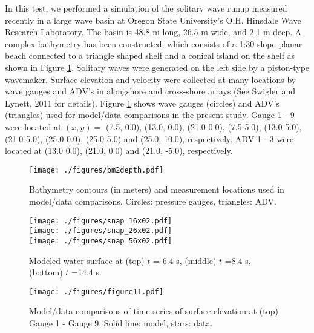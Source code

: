 \documentclass[11pt]{article}
\begin{document}
In this test, we performed a simulation of the solitary wave runup measured  recently in a large wave basin at Oregon State University's O.H. Hinsdale Wave Research Laboratory.  The basin is 48.8 m long, 26.5 m wide, and 2.1 m deep.  A complex bathymetry has been constructed, which  consists of  a 1:30 slope planar beach connected to a triangle shaped  shelf and a conical island on the shelf as shown  in Figure \ref{fig8}.    Solitary waves were generated on the left side by a piston-type wavemaker. Surface elevation and velocity were collected at many locations by wave gauges and ADV's in alongshore and cross-shore arrays (See Swigler and Lynett, 2011 for details). Figure \ref{fig8} shows  wave gauges (circles)  and  ADV's (triangles) used for model/data comparisons in the present study. Gauge 1 - 9 were located at $(x,y) = $ (7.5, 0.0), (13.0, 0.0), (21.0 0.0), (7.5 5.0), (13.0 5.0), (21.0 5.0), (25.0 0.0), (25.0 5.0) and (25.0, 10.0), respectively. ADV 1 -  3 were located at (13.0 0.0), (21.0, 0.0) and (21.0, -5.0), respectively.   



\begin{figure}[htbp]
\centering
\texttt{[image: ./figures/bm2depth.pdf]}
\caption{Bathymetry contours (in meters) and measurement locations used in model/data comparisons. Circles: pressure gauges, triangles: ADV.}
\label{fig8}
\end{figure}


\begin{figure}[htbp]
\centering
\texttt{[image: ./figures/snap\_16x02.pdf]} \\
\texttt{[image: ./figures/snap\_26x02.pdf]} \\
\texttt{[image: ./figures/snap\_56x02.pdf]}			
\caption{Modeled water surface at (top)  $t$ = 6.4 s, (middle) $ t$ =8.4 s, (bottom) $ t$ =14.4 s.}
\label{snap1}
\end{figure}


\begin{figure}[htbp]
\centering
\texttt{[image: ./figures/figure11.pdf]}	
\caption{Model/data comparisons of time series of surface elevation at (top) Gauge 1 -  Gauge 9. Solid line: model,  stars: data.}
\label{gauge1}
\end{figure}
\end{document}
